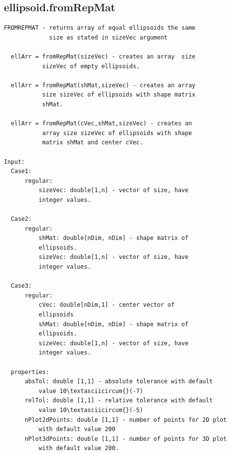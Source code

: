 \documentclass[letterpaper,10pt,english]{sphinxmanual}
\begin{document}
\subsection{ellipsoid.fromRepMat}
\label{chap_functions:ellipsoid-fromrepmat}
\begin{Verbatim}[commandchars=\\\{\}]
FROMREPMAT - returns array of equal ellipsoids the same
             size as stated in sizeVec argument

  ellArr = fromRepMat(sizeVec) - creates an array  size
           sizeVec of empty ellipsoids.

  ellArr = fromRepMat(shMat,sizeVec) - creates an array
           size sizeVec of ellipsoids with shape matrix
           shMat.

  ellArr = fromRepMat(cVec,shMat,sizeVec) - creates an
           array size sizeVec of ellipsoids with shape
           matrix shMat and center cVec.

Input:
  Case1:
      regular:
          sizeVec: double[1,n] - vector of size, have
          integer values.

  Case2:
      regular:
          shMat: double[nDim, nDim] - shape matrix of
          ellipsoids.
          sizeVec: double[1,n] - vector of size, have
          integer values.

  Case3:
      regular:
          cVec: double[nDim,1] - center vector of
          ellipsoids
          shMat: double[nDim, nDim] - shape matrix of
          ellipsoids.
          sizeVec: double[1,n] - vector of size, have
          integer values.

  properties:
      absTol: double [1,1] - absolute tolerance with default
          value 10\textasciicircum{}(-7)
      relTol: double [1,1] - relative tolerance with default
          value 10\textasciicircum{}(-5)
      nPlot2dPoints: double [1,1] - number of points for 2D plot
          with default value 200
      nPlot3dPoints: double [1,1] - number of points for 3D plot
          with default value 200.
\end{Verbatim}
\end{document}
